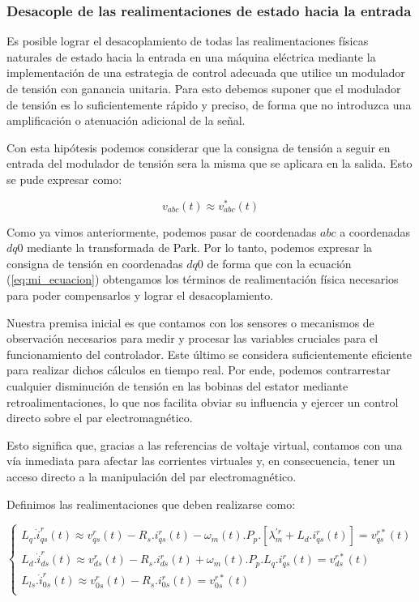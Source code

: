 \documentclass{article}
\begin{document}

\subsubsection{Desacople de las realimentaciones de estado hacia la entrada}

Es posible lograr el desacoplamiento de todas las realimentaciones físicas naturales de 
estado hacia la entrada en una máquina eléctrica mediante la implementación de una estrategia 
de control adecuada que utilice un modulador de tensión con ganancia unitaria. Para esto debemos 
suponer que el modulador de tensión es lo suficientemente rápido y preciso, de forma que no 
introduzca una amplificación o atenuación adicional de la señal. 

Con esta hipótesis podemos considerar que la consigna de tensión a seguir en entrada del modulador 
de tensión sera la misma que se aplicara en la salida. Esto se pude expresar como: 

\begin{equation}
    v_{abc}(t) \approx v^*_{abc}(t)
\end{equation}

Como ya vimos anteriormente, podemos pasar de coordenadas $abc$ a coordenadas $dq0$ mediante la
transformada de Park. Por lo tanto, podemos expresar la consigna de tensión en coordenadas $dq0$
de forma que con la ecuación (\ref{eq:mi_ecuacion}) obtengamos los términos de  realimentación física 
necesarios para poder compensarlos y lograr el desacoplamiento.

Nuestra premisa inicial es que contamos con los sensores o mecanismos de observación necesarios para 
medir y procesar las variables cruciales para el funcionamiento del controlador. Este último se 
considera suficientemente eficiente para realizar dichos cálculos en tiempo real. Por ende, podemos 
contrarrestar cualquier disminución de tensión en las bobinas del estator mediante retroalimentaciones, 
lo que nos facilita obviar su influencia y ejercer un control directo sobre el par electromagnético.

Esto significa que, gracias a las referencias de voltaje virtual, contamos con una vía inmediata para 
afectar las corrientes virtuales y, en consecuencia, tener un acceso directo a la manipulación del par 
electromagnético.

Definimos las realimentaciones que deben realizarse como:

\begin{equation}\label{eq:compensaciones}
    \begin{cases}
        L_q.\dot{i}^r_{qs}(t) \approx v^{r}_{qs}(t) - R_{s}.i_{qs}^r(t) - \omega_m(t).P_p.[\lambda^{\prime r}_m + L_d.i_{qs}^r(t)] = v^{r*}_{qs}(t)\\
        L_d.\dot{i}^r_{ds}(t) \approx v^{r}_{ds}(t) - R_{s}.i_{ds}^r(t) + \omega_m(t).P_p.L_q.i_{qs}^r(t) = v^{r*}_{ds}(t)\\
        L_{ls}.\dot{i}^r_{0s}(t) \approx v^{r}_{0s}(t) - R_{s}.i_{0s}^r(t) = v^{r*}_{0s}(t)\\
    \end{cases}
\end{equation}
\end{document}
